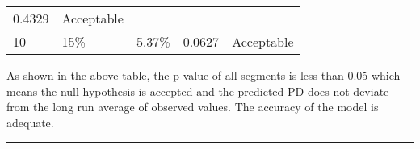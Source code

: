 \begin{longtable}[]{@{}lllll@{}}
\begin{minipage}[t]{0.19\columnwidth}
0.4329\strut
\end{minipage} & \begin{minipage}[t]{0.18\columnwidth}\raggedright
Acceptable\strut
\end{minipage}\tabularnewline
\begin{minipage}[t]{0.12\columnwidth}\raggedright
10\strut
\end{minipage} & \begin{minipage}[t]{0.26\columnwidth}\raggedright
15\%\strut
\end{minipage} & \begin{minipage}[t]{0.12\columnwidth}\raggedright
5.37\%\strut
\end{minipage} & \begin{minipage}[t]{0.19\columnwidth}\raggedright
0.0627\strut
\end{minipage} & \begin{minipage}[t]{0.18\columnwidth}\raggedright
Acceptable\strut
\end{minipage}\tabularnewline
\bottomrule
\end{longtable}

As shown in the above table, the p value of all segments is less than
0.05 which means the null hypothesis is accepted and the predicted PD
does not deviate from the long run average of observed values. The
accuracy of the model is adequate.

\begin{center}\rule{0.5\linewidth}{\linethickness}\end{center}
